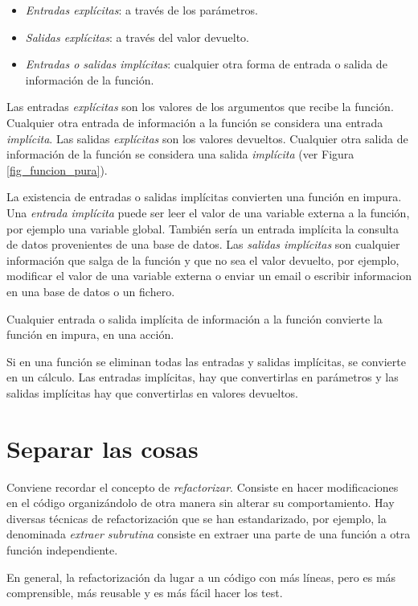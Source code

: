 \begin{itemize}
   \item \textit{Entradas explícitas}: a través de los parámetros.
   \item \textit{Salidas explícitas}: a través del valor devuelto.
   \item \textit{Entradas o salidas implícitas}: cualquier otra forma de entrada o salida de información de la función. 
\end{itemize}

Las entradas \textit{explícitas} son los valores de los argumentos que recibe la función. Cualquier otra entrada de información a la función se considera una entrada \textit{implícita}. Las salidas \textit{explícitas} son los valores devueltos. Cualquier otra salida de información de la función se considera una salida \textit{implícita} (ver Figura \ref{fig_funcion_pura}).

La existencia de entradas o salidas implícitas convierten una función en impura. Una \textit{entrada implícita} puede ser leer el valor de una variable externa a la función, por ejemplo una variable global. También sería un entrada implícita la consulta de datos provenientes de una base de datos. Las \textit{salidas implícitas} son cualquier información que salga de la función y que no sea el valor devuelto, por ejemplo, modificar el valor de una variable externa o enviar un email o escribir informacion en una base de datos o un fichero.

Cualquier entrada o salida implícita de información a la función convierte la función en impura, en una acción. 

Si en una función se eliminan todas las entradas y salidas implícitas, se convierte en un cálculo. Las entradas implícitas, hay que convertirlas en parámetros y las salidas implícitas hay que convertirlas en valores devueltos.

\section{Separar las cosas}
\noindent Conviene recordar el concepto de \textit{refactorizar}. Consiste en hacer modificaciones en el código organizándolo de otra manera sin alterar su comportamiento. Hay diversas técnicas de refactorización que se han estandarizado, por ejemplo, la denominada \textit{extraer subrutina} consiste en extraer una parte de una función a otra función independiente.

En general, la refactorización da lugar a un código con más líneas, pero es más comprensible, más reusable y es más fácil hacer los test.

